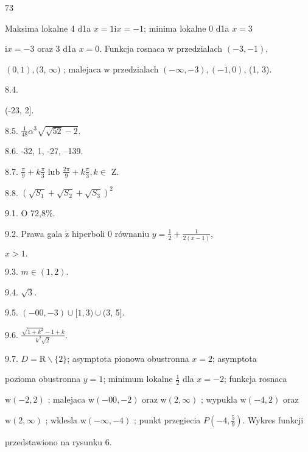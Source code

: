 \documentclass[a4paper,12pt]{article}
\begin{document}
73

Maksima lokalne 4 d1a $x = 1 \mathrm{i}x = -1$; minima lokalne 0 d1a $x = 3$

$\mathrm{i} x = -3$ oraz 3 d1a $x = 0$. Funkcja rosnaca $\mathrm{w}$ przedzialach $(-3,-1),$

$(0,1), ($3, $\infty)$ ; malejaca $\mathrm{w}$ przedzialach $(-\infty,-3), (-1,0)$, (1, 3).

8.4.

(-23, 2].

8.5. $\displaystyle \frac{1}{48}\alpha^{3}\sqrt{\sqrt{52}-2}.$

8.6. -32, 1, -27, --139.

8.7. $\displaystyle \frac{\pi}{9}+k\frac{\pi}{3}$ lub $\displaystyle \frac{2\pi}{9}+k\frac{\pi}{3},  k\in$ Z.

8.8. $(\sqrt{S_{1}}+\sqrt{S_{2}}+\sqrt{S_{3}})^{2}$

9.1. $\mathrm{O}$ 72,8\%.

9.2. Prawa gala $\acute{\mathrm{z}}$ hiperboli $0$ równaniu $y=\displaystyle \frac{1}{2}+\frac{1}{2(x-1)}$,

$x>1.$

9.3. $m\in(1,2).$

9.4. $\sqrt{3}.$

9.5. $(- 00,-3)\cup[1,3)\cup(3$, 5$].$

9.6. $\displaystyle \frac{\sqrt{1+k^{2}}-1+k}{k^{2}\sqrt{2}}.$

9.7. $D=\mathrm{R}\backslash \{2\}$; asymptota pionowa obustronna $x= 2$; asymptota

pozioma obustronna $y=1$; minimum lokalne $\displaystyle \frac{1}{2}$ dla $x=-2$; funkcja rosnaca

$\mathrm{w} (-2,2)$ ; malejaca $\mathrm{w} (- 00,-2)$ oraz $\mathrm{w} (2,\infty)$ ; wypukla $\mathrm{w} (-4,2)$ oraz

$\mathrm{w}(2,\infty)$ ; wklesla $\mathrm{w}(-\infty,-4)$ ; punkt przegiecia $P(-4,\displaystyle \frac{5}{9})$. Wykres funkcji

przedstawiono na rysunku 6.
\end{document}
